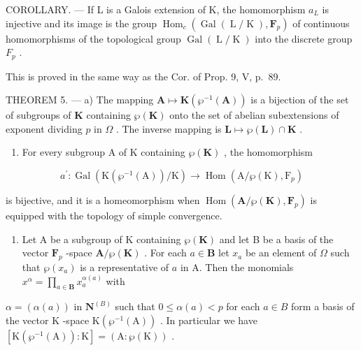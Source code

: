 COROLLARY. --- If L is a Galois extension of K, the homomorphism \(a_{L}\) is injective and its image is the group \(\operatorname{Hom}_{c}(\operatorname{Gal}(\operatorname{L}/\operatorname{K}), \mathbf{F}_{p})\) of continuous homomorphisms of the topological group \(\operatorname{Gal}(\operatorname{L}/\operatorname{K})\) into the discrete group \(F_{p}\) .

This is proved in the same way as the Cor. of Prop. 9, V, p.~89.

THEOREM 5. --- a) The mapping \(\mathbf{A} \mapsto \mathbf{K}(\wp^{-1}(\mathbf{A}))\) is a bijection of the set of subgroups of \(\mathbf{K}\) containing \(\wp(\mathbf{K})\) onto the set of abelian subextensions of exponent dividing \(p\) in \(\Omega\) . The inverse mapping is \(\mathbf{L} \mapsto \wp(\mathbf{L}) \cap \mathbf{K}\) .

\begin{enumerate}
\def\labelenumi{\alph{enumi})}
\setcounter{enumi}{1}
\tightlist
\item
  For every subgroup A of K containing \(\wp(\mathbf{K})\) , the homomorphism
\end{enumerate}

\[
a ^ {\prime}: \operatorname{Gal} \left(\mathrm{K} \left(\wp^ {- 1} (\mathrm{A})\right) / \mathrm{K}\right)\rightarrow \operatorname{Hom} \left(\mathrm{A} / \wp (\mathrm{K}), \mathrm{F} _ {p}\right)
\]

is bijective, and it is a homeomorphism when \(\operatorname{Hom}(\mathbf{A}/\wp(\mathbf{K}), \mathbf{F}_p)\) is equipped with the topology of simple convergence.

\begin{enumerate}
\def\labelenumi{\alph{enumi})}
\setcounter{enumi}{2}
\tightlist
\item
  Let A be a subgroup of K containing \(\wp(\mathbf{K})\) and let B be a basis of the vector \(\mathbf{F}_{p}\) -space \(\mathbf{A}/\wp(\mathbf{K})\) . For each \(a \in \mathbf{B}\) let \(x_{a}\) be an element of \(\Omega\) such that \(\wp(x_{a})\) is a representative of \(a\) in A. Then the monomials \(x^{\alpha} = \prod_{a \in \mathbf{B}} x_{a}^{\alpha(a)}\) with
\end{enumerate}

\(\alpha = (\alpha(a))\) in \(\mathbf{N}^{(B)}\) such that \(0 \leqslant \alpha(a) < p\) for each \(a \in B\) form a basis of the vector \(\mathrm{K}\) -space \(\mathrm{K}(\wp^{-1}(\mathrm{A}))\) . In particular we have \([\mathrm{K}(\wp^{-1}(\mathrm{A})): \mathrm{K}] = (\mathrm{A}: \wp(\mathrm{K}))\) .


